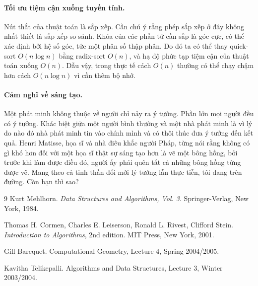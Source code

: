 \documentclass[11pt]{article}
\begin{document}
\paragraph{Tối ưu tiệm cận xuống tuyến tính.}
Nút thắt của thuật toán là sắp xếp. Cần chú ý rằng phép sắp xếp ở đây không
nhất thiết là sắp xếp so sánh. Khóa của các phần tử cần sắp là góc cực, có thể
xác định bởi hệ số góc, tức một phân số thập phân. Do đó ta có thể thay
quick-sort \(O(n\log n)\) bằng radix-sort \(O(n)\), và hạ độ phức tạp tiệm cận
của thuật toán xuống \(O(n)\). Dẫu vậy, trong thực tế cách \(O(n)\) thường có
thể chạy chậm hơn cách \(O(n\log n)\) vì cần thêm bộ nhớ.

\paragraph{Cảm nghĩ về sáng tạo.}
Một phát minh không thuộc về người chỉ nảy ra ý tưởng. Phần lớn mọi người đều
có ý tưởng. Khác biệt giữa một người bình thường và một nhà phát minh là vì lý
do nào đó nhà phát minh tin vào chính mình và có thôi thúc đưa ý tưởng đến kết
quả. Henri Matisse, họa sĩ và nhà điêu khắc người Pháp, từng nói rằng không
có gì khó hơn đối với một họa sĩ thật sự sáng tạo hơn là vẽ một bông hồng, bởi
trước khi làm được điều đó, người ấy phải quên tất cả những bông hồng từng
được vẽ. Mang theo cả tinh thần đổi mới lý tưởng lẫn thực tiễn, tôi đang trên
đường. Còn bạn thì sao?

\begin{thebibliography}{9}
Kurt Mehlhorn.
\newblock \textit{Data Structures and Algorithms, Vol. 3}.
\newblock Springer-Verlag, New York, 1984.

Thomas H. Cormen, Charles E. Leiserson, Ronald L. Rivest, Clifford Stein.
\newblock \textit{Introduction to Algorithms}, 2nd edition.
\newblock MIT Press, New York, 2001.

Gill Barequet.
\newblock Computational Geometry, Lecture 4, Spring 2004/2005.

Kavitha Telikepalli.
\newblock Algorithms and Data Structures, Lecture 3, Winter 2003/2004.
\end{thebibliography}
\end{document}
